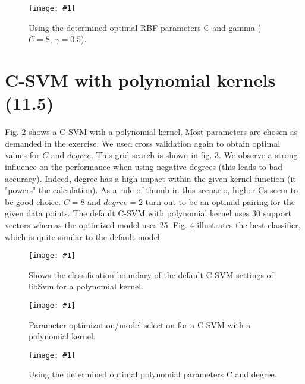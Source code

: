 \documentclass[a4paper,headings=small]{scrartcl}
\newcommand{\image}[3]{
	\begin{figure}[htbp]
		\centering
		\texttt{[image: \#1]}
		\caption{#3}
		\label{fig:#1}
	\end{figure}
}
\begin{document}
\image{out_classifierSvm_cSvmRbfOptimalParams}{0.9}%
	{Using the determined optimal RBF parameters C and gamma ($C = 8$, $\gamma = 0.5$).}


\section{C-SVM with polynomial kernels (11.5)}

Fig. \ref{fig:out_classifierSvm_cSvmPolyDefault} shows a C-SVM with a polynomial kernel. Most parameters are chosen as demanded in the exercise. We used cross validation again to obtain optimal values for $C$ and $degree$. This grid search is shown in fig. \ref{fig:out_cSvmPolyParameterOptimization}. We observe a strong influence on the performance when using negative degrees (this leads to bad accuracy). Indeed, degree has a high impact within the given kernel function (it "powers" the calculation). As a rule of thumb in this scenario, higher Cs seem to be good choice. $C = 8$ and $degree = 2$ turn out to be an optimal pairing for the given data points. The default C-SVM with polynomial kernel uses 30 support vectors whereas the optimized model uses 25. Fig. \ref{fig:out_classifierSvm_cSvmPolyOptimalParams} illustrates the best classifier, which is quite similar to the default model.

\image{out_classifierSvm_cSvmPolyDefault}{0.9}%
	{Shows the classification boundary of the default C-SVM settings of libSvm for a polynomial kernel.}

\image{out_cSvmPolyParameterOptimization}{0.9}%
	{Parameter optimization/model selection for a C-SVM with a polynomial kernel.}

\image{out_classifierSvm_cSvmPolyOptimalParams}{0.9}%
	{Using the determined optimal polynomial parameters C and degree.}
\end{document}
